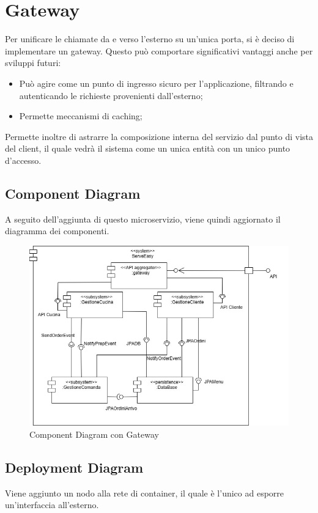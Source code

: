 \section{Gateway}
Per unificare le chiamate da e verso l'esterno su un'unica porta, si è deciso di implementare un gateway.
Questo può comportare significativi vantaggi anche per sviluppi futuri:
\begin{itemize}
    \item Può agire come un punto di ingresso sicuro per l’applicazione, filtrando e autenticando le richieste provenienti dall’esterno;
    \item Permette meccanismi di caching; 
\end{itemize}

Permette inoltre di astrarre la composizione interna del servizio dal punto di vista del client, il quale vedrà il sistema come un unica entità con un unico punto d'accesso.

\subsection{Component Diagram}
A seguito dell'aggiunta di questo microservizio, viene quindi aggiornato il diagramma dei componenti.

\begin{figure}[htbp]
	\centering
	\includegraphics[scale=0.35]{iterazione3/images/component_gateway.jpg}
	\caption{Component Diagram con Gateway
 \label{fig:componentgateway}}
\end{figure}

\subsection{Deployment Diagram}
Viene aggiunto un nodo alla rete di container, il quale è l'unico ad esporre un'interfaccia all'esterno.




